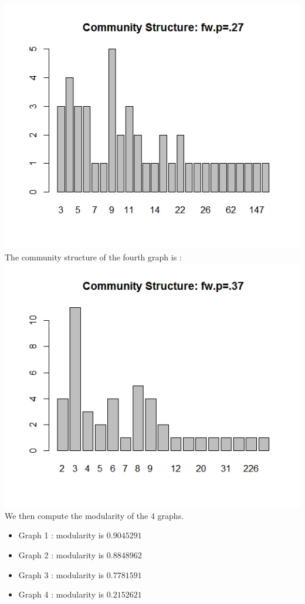 \documentclass{article}
\begin{document}
\includegraphics[scale=0.4]{pd13} \\
The community structure of the fourth graph is :\\
\includegraphics[scale=0.4]{pd18} \\
We then compute the modularity of the 4 graphs.\\
\begin{itemize}
 \item 
 Graph 1 : modularity is $0.9045291$
 \item 
 Graph 2 : modularity is $0.8848962$
 \item 
 Graph 3 : modularity is $0.7781591$
 \item 
 Graph 4 : modularity is $0.2152621$
\end{itemize}
\end{document}
